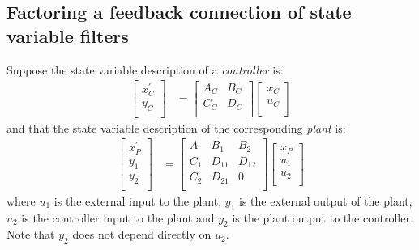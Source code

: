 \documentclass[a4paper,twoside,10pt,english]{report}
\begin{document}
\subsection{Factoring a feedback connection of state variable filters}
Suppose the state variable description of a \emph{controller} is:
\begin{align*}
\left[ \begin{array}{c}
x^{\prime}_{C} \\ 
y_{C} \\
\end{array}\right]
 &= 
\left[ \begin{array}{cc}
A_{C} & B_{C} \\ 
C_{C} & D_{C} \\
\end{array}\right]
\left[ \begin{array}{c}
x_{C} \\ 
u_{C} \\
\end{array}\right]
\end{align*}
and that the state variable description of the corresponding \emph{plant} is:
\begin{align*}
\left[ \begin{array}{c}
x^{\prime}_{P} \\ 
y_{1}\\
y_{2}\\
\end{array}\right]
 &= 
\left[ \begin{array}{ccc}
A & B_{1} & B_{2}\\ 
C_{1} & D_{11} & D_{12}\\
C_{2} & D_{21} & 0 \\
\end{array}\right]
\left[ \begin{array}{c}
x_{P} \\ 
u_{1}\\
u_{2} \\
\end{array}\right]
\end{align*}
where $u_{1}$ is the external input to the plant, $y_{1}$ is the external
output of the plant, $u_{2}$ is the controller input to the plant and $y_{2}$
is the plant output to the controller. Note that $y_{2}$ does not depend 
directly on $u_{2}$. 
\end{document}
